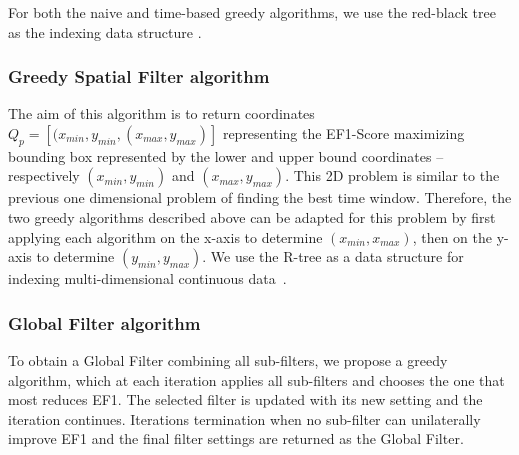 For both the naive and time-based greedy algorithms, we use the red-black tree as the indexing data structure \cite{Guibas1978}.


\subsubsection{Greedy Spatial Filter algorithm}

The aim of this algorithm is to return coordinates $Q_p=[(x_{min},y_{min},(x_{max},y_{max})]$ representing the EF1-Score maximizing bounding box represented by the lower and upper bound coordinates -- respectively $(x_{min},y_{min})$ and $(x_{max},y_{max})$. This 2D problem is similar to the previous one dimensional problem of finding the best time window. Therefore, the two greedy algorithms described above can be adapted for this problem by first applying each algorithm on the x-axis to determine $(x_{min},x_{max})$, then on the y-axis to determine $(y_{min},y_{max})$. 
We use the R-tree as a data structure for indexing multi-dimensional continuous data~\cite{Guttman1984}.


\subsubsection{Global Filter algorithm} To obtain a Global Filter combining all sub-filters, we propose a greedy algorithm, which at each iteration applies all sub-filters and chooses the one that most reduces EF1.  The selected filter is updated with its new setting and the iteration continues.  Iterations termination when no sub-filter can unilaterally improve EF1 and the final filter settings are returned as the Global Filter.

